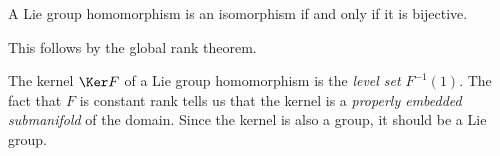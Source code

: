 \begin{corollary}\label{3.0.8}
	A Lie group homomorphism is an isomorphism if and only if it is bijective.
\end{corollary}
This follows by the global rank theorem.

\begin{remark}
	The kernel $\Ker F$ of a Lie group homomorphism is the \emph{level set} $F^{-1} (1)$. The fact that $F$ is constant rank tells us that the kernel is a \emph{properly embedded submanifold} of the domain. Since the kernel is also a group, it should be a Lie group.
\end{remark}

